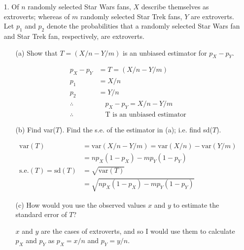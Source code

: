     \begin{itemize}
        \item [1.]
        Of $n$ randomly selected Star Wars fans, $X$ describe themselves as extroverts; whereas of $m$ randomly selected Star Trek fans, $Y$ are extroverts. Let $p_{1}$ and $p_{2}$ denote the probabilities that a randomly selected Star Wars fan and Star Trek fan, respectively, are extroverts.

        \begin{itemize}
            \item [(a)]
            Show that $T = (X/n - Y /m)$ is an unbiased estimator for $p_{X} - p_{Y}$.
            \begin{mdframed}
                \begin{align*}
                    p_{X}-p_{Y} & = T = (X/n - Y/m)                 \\
                    p_{1}       & = X/n                             \\
                    p_{2}       & = Y/n                             \\
                    \therefore  & \quad  p_{X} - p_{Y} = X/n - Y/m  \\
                    \therefore  & \quad \text{T is an unbiased estimator}
                \end{align*}
            \end{mdframed}

            \item [(b)]
            Find var($T$). Find the s.e. of the estimator in (a); i.e. find sd($T$).
            \begin{mdframed}
                \begin{align*}
                    \text{var}(T)   & = \text{var}(X/n - Y/m)
                                      = \text{var}(X/n) - \text{var}(Y/m)           \\
                                    & = \boxed{np_{X}(1-p_{X}) - mp_{Y}(1-p_{Y})}   \\
                    \text{s.e.}(T) = \text{sd}(T)& = \sqrt{\text{var}(T)}           \\
                                    & = \boxed{\sqrt{np_{X}(1-p_{X}) - mp_{Y}(1-p_{Y})}}
                \end{align*}
            \end{mdframed}

            \item [(c)]
            How would you use the observed values $x$ and $y$ to estimate the standard error of $T$?
            \begin{mdframed}
                $x$ and $y$ are the cases of extroverts, and so I would use them to calculate $p_{X}$ and $p_{Y}$ as $p_{X} = x/n$ and $p_{Y} = y/n$.
            \end{mdframed}


\end{itemize}
\end{itemize}
